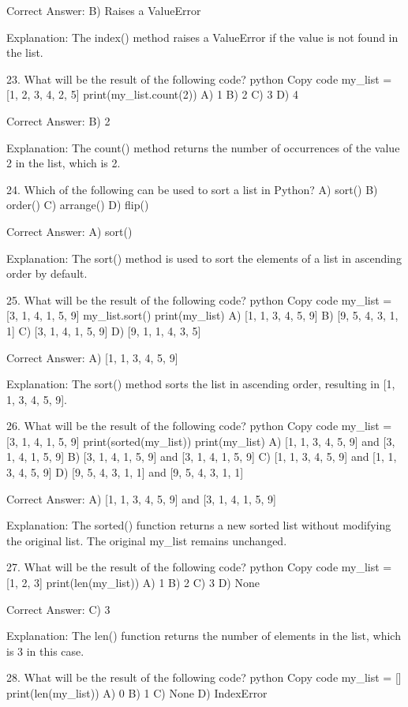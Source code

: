 Correct Answer: B) Raises a ValueError

Explanation:
The index() method raises a ValueError if the value is not found in the list.

23. What will be the result of the following code?
python
Copy code
my_list = [1, 2, 3, 4, 2, 5]
print(my_list.count(2))
A) 1
B) 2
C) 3
D) 4

Correct Answer: B) 2

Explanation:
The count() method returns the number of occurrences of the value 2 in the list, which is 2.

24. Which of the following can be used to sort a list in Python?
A) sort()
B) order()
C) arrange()
D) flip()

Correct Answer: A) sort()

Explanation:
The sort() method is used to sort the elements of a list in ascending order by default.

25. What will be the result of the following code?
python
Copy code
my_list = [3, 1, 4, 1, 5, 9]
my_list.sort()
print(my_list)
A) [1, 1, 3, 4, 5, 9]
B) [9, 5, 4, 3, 1, 1]
C) [3, 1, 4, 1, 5, 9]
D) [9, 1, 1, 4, 3, 5]

Correct Answer: A) [1, 1, 3, 4, 5, 9]

Explanation:
The sort() method sorts the list in ascending order, resulting in [1, 1, 3, 4, 5, 9].

26. What will be the result of the following code?
python
Copy code
my_list = [3, 1, 4, 1, 5, 9]
print(sorted(my_list))
print(my_list)
A) [1, 1, 3, 4, 5, 9] and [3, 1, 4, 1, 5, 9]
B) [3, 1, 4, 1, 5, 9] and [3, 1, 4, 1, 5, 9]
C) [1, 1, 3, 4, 5, 9] and [1, 1, 3, 4, 5, 9]
D) [9, 5, 4, 3, 1, 1] and [9, 5, 4, 3, 1, 1]

Correct Answer: A) [1, 1, 3, 4, 5, 9] and [3, 1, 4, 1, 5, 9]

Explanation:
The sorted() function returns a new sorted list without modifying the original list. The original my_list remains unchanged.

27. What will be the result of the following code?
python
Copy code
my_list = [1, 2, 3]
print(len(my_list))
A) 1
B) 2
C) 3
D) None

Correct Answer: C) 3

Explanation:
The len() function returns the number of elements in the list, which is 3 in this case.

28. What will be the result of the following code?
python
Copy code
my_list = []
print(len(my_list))
A) 0
B) 1
C) None
D) IndexError

